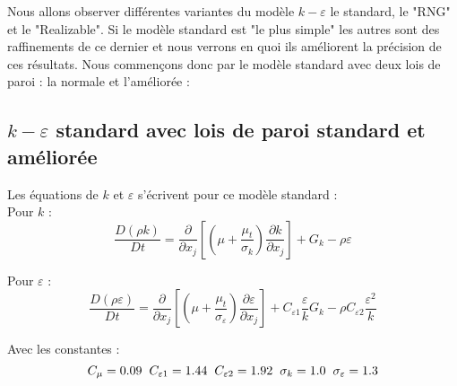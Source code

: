 \documentclass[a4paper,10pt]{article}
\newcommand{\keps}{$k-\varepsilon$}
\newcommand{\npurple}{\color{forest}}
\newcommand\black{\color{black}}
\begin{document}
\noindent Nous allons observer différentes variantes du modèle \keps $ $ le standard, le "RNG" et le "Realizable". Si le modèle standard est "le plus simple" les autres sont des raffinements de ce dernier et nous verrons en quoi ils améliorent la précision de ces résultats. Nous commençons donc par le modèle standard avec deux lois de paroi : la normale et l'améliorée :

 \npurple
 
 \subsection{ \keps $ $ standard avec lois de paroi standard et améliorée} \black
Les équations de $k$ et $\varepsilon$ s'écrivent pour ce modèle standard : \\
\indent Pour $k$ :
\begin{equation}
\frac{D\left( \rho k \right)}{Dt} = \frac{\partial }{\partial x_j} \left[ \left( \mu + \frac{\mu_t}{\sigma_k} \right) \frac{\partial k}{\partial x_j} \right] + G_k -\rho \varepsilon \label{k_keps}
\end{equation}

Pour $\varepsilon$ :
\begin{equation}
\frac{D\left( \rho \varepsilon \right)}{Dt} = \frac{\partial }{\partial x_j} \left[ \left( \mu + \frac{\mu_t}{\sigma_\varepsilon} \right) \frac{\partial \varepsilon}{\partial x_j} \right] + C_{\varepsilon 1} \frac{\varepsilon}{k} G_k -\rho C_{\varepsilon 2} \frac{\varepsilon^2}{k} \label{eps_keps}
\end{equation}

Avec les constantes :
\begin{equation}
C_\mu = 0.09 \text{\hspace{2 mm}} C_{\varepsilon 1} = 1.44 \text{\hspace{2 mm}} C_{\varepsilon 2} = 1.92 \text{\hspace{2 mm}} \sigma_k = 1.0 \text{\hspace{2 mm}} \sigma_\varepsilon = 1.3 \label{keps_constantes}
\end{equation}
\end{document}
